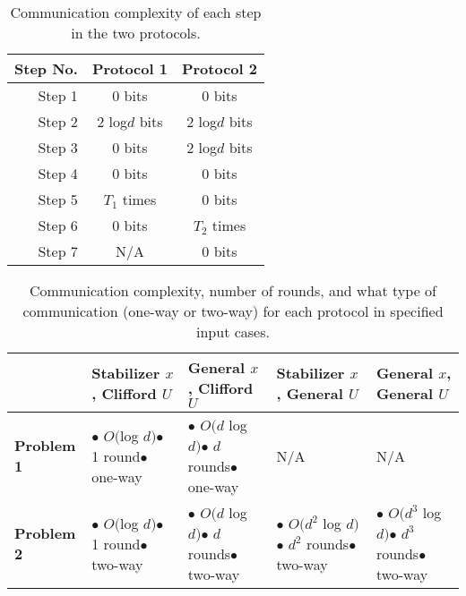 \documentclass[../3Wworkreport.tex]{subfiles}
\begin{document}
\begin{table}[h]
\begin{center}
\begin{tabular}{r | c | c}
	\textbf{Step No.} & \textbf{Protocol 1} & \textbf{Protocol 2}\\\hline
	Step 1 & 0 bits & 0 bits \\\hline
	Step 2 & 2 log$d$ bits & 2 log$d$ bits \\\hline
	Step 3 & 0 bits& 2 log$d$ bits \\\hline
	Step 4 & 0 bits & 0 bits\\\hline
	Step 5 & $T_1$ times & 0 bits \\\hline
	Step 6 & 0 bits & $T_2$ times\\\hline
	Step 7 & N/A & 0 bits \\\hline
\end{tabular}
\end{center}
	\caption{Communication complexity of each step in the two protocols.}
	\label{tab:step_complex}
\end{table}

\begin{table}[h]
\begin{center}
\begin{tabular}{l | p{} | p{} | p{} | p{}}
	& {\bfseries Stabilizer $x$, Clifford $U$}
		& \textbf{General $x$, Clifford $U$}
		& \textbf{Stabilizer $x$, General $U$}
		& \textbf{General $x$, General $U$}\\\hline
	\textbf{Problem 1}
		& $\bullet$ $O($log $d)$\newline $\bullet$ 1 round\newline $\bullet$ one-way
		& $\bullet$ $O(d$ log $d)$\newline $\bullet$ $d$ rounds\newline $\bullet$ one-way
		& N/A
		& N/A \\\hline
	\textbf{Problem 2}
		& $\bullet$ $O($log $d)$\newline $\bullet$ 1 round\newline $\bullet$ two-way
		& $\bullet$ $O(d$ log $d)$\newline $\bullet$ $d$ rounds\newline $\bullet$ two-way
		& $\bullet$ $O(d^2$ log $d)$\newline $\bullet$ $d^2$ rounds\newline $\bullet$ two-way
		& $\bullet$ $O(d^3$ log $d)$\newline $\bullet$ $d^3$ rounds\newline $\bullet$ two-way \\\hline
\end{tabular}
\end{center}
	\caption[Communication complexity of protocols.]{Communication complexity, number of rounds, and what type of communication (one-way or two-way) for each protocol in specified input cases.}
	\label{tab:protocol_complex}
\end{table}
\end{document}
